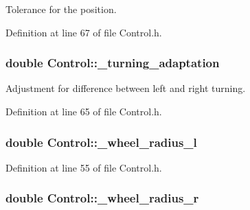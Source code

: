 Tolerance for the position. 



Definition at line 67 of file Control.\-h.

\hypertarget{classControl_abcfbef74fbe58b4c24efd11e1c7364f5}{
\subsubsection[{\-\_\-turning\-\_\-adaptation}]{\setlength{\rightskip}{0pt plus 5cm}double Control\-::\-\_\-turning\-\_\-adaptation\hspace{0.3cm}{\ttfamily [private]}}}\label{classControl_abcfbef74fbe58b4c24efd11e1c7364f5}


Adjustment for difference between left and right turning. 



Definition at line 65 of file Control.\-h.

\hypertarget{classControl_a754081ecec9e1e75fc6df94c22d9df3e}{
\subsubsection[{\-\_\-wheel\-\_\-radius\-\_\-l}]{\setlength{\rightskip}{0pt plus 5cm}double Control\-::\-\_\-wheel\-\_\-radius\-\_\-l\hspace{0.3cm}{\ttfamily [private]}}}\label{classControl_a754081ecec9e1e75fc6df94c22d9df3e}


Definition at line 55 of file Control.\-h.

\hypertarget{classControl_a502e3555475215826fc7f9b64ec8e0b2}{
\subsubsection[{\-\_\-wheel\-\_\-radius\-\_\-r}]{\setlength{\rightskip}{0pt plus 5cm}double Control\-::\-\_\-wheel\-\_\-radius\-\_\-r\hspace{0.3cm}{\ttfamily [private]}}}\label{classControl_a502e3555475215826fc7f9b64ec8e0b2}


